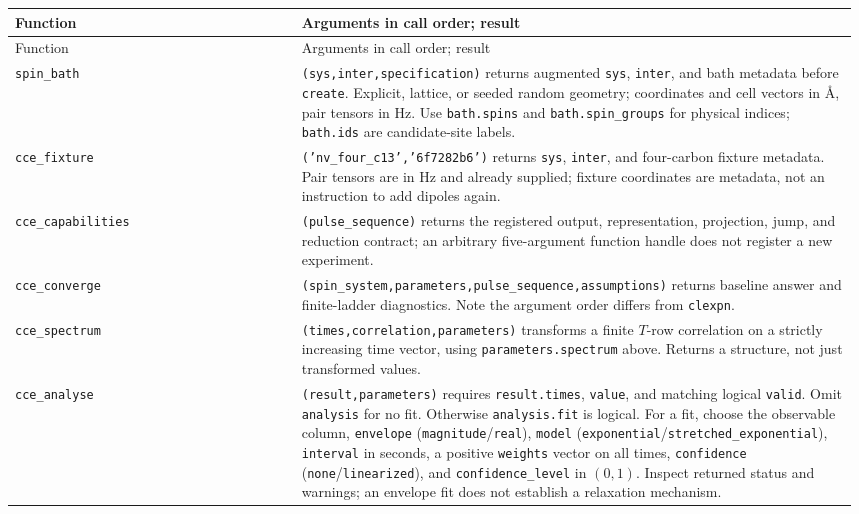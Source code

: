 \documentclass[11pt,a4paper]{article}
\newcommand{\code}[1]{\texttt{#1}}
\begin{document}
\begingroup\small
\begin{longtable}{@{}>{\raggedright\arraybackslash}p{0.335\linewidth}@{\hspace{0.025\linewidth}}>{\raggedright\arraybackslash}p{0.64\linewidth}@{}}
\toprule
Function & Arguments in call order; result\\
\midrule\endfirsthead
\toprule
Function & Arguments in call order; result\\
\midrule\endhead
\midrule\endfoot
\bottomrule\endlastfoot
\code{spin\_bath} & \code{(sys,inter,specification)} returns augmented \code{sys}, \code{inter}, and bath metadata before \code{create}. Explicit, lattice, or seeded random geometry; coordinates and cell vectors in \AA{}, pair tensors in Hz. Use \code{bath.spins} and \code{bath.spin\_groups} for physical indices; \code{bath.ids} are candidate-site labels.\\
\code{cce\_fixture} & \code{('nv\_four\_c13','6f7282b6')} returns \code{sys}, \code{inter}, and four-carbon fixture metadata. Pair tensors are in Hz and already supplied; fixture coordinates are metadata, not an instruction to add dipoles again.\\
\code{cce\_capabilities} & \code{(pulse\_sequence)} returns the registered output, representation, projection, jump, and reduction contract; an arbitrary five-argument function handle does not register a new experiment.\\
\code{cce\_converge} & \code{(spin\_system,parameters,pulse\_sequence,assumptions)} returns baseline answer and finite-ladder diagnostics. Note the argument order differs from \code{clexpn}.\\
\code{cce\_spectrum} & \code{(times,correlation,parameters)} transforms a finite $T$-row correlation on a strictly increasing time vector, using \code{parameters.spectrum} above. Returns a structure, not just transformed values.\\
\code{cce\_analyse} & \code{(result,parameters)} requires \code{result.times}, \code{value}, and matching logical \code{valid}. Omit \code{analysis} for no fit. Otherwise \code{analysis.fit} is logical. For a fit, choose the observable column, \code{envelope} (\code{magnitude}/\code{real}), \code{model} (\code{exponential}/\code{stretched\_exponential}), \code{interval} in seconds, a positive \code{weights} vector on all times, \code{confidence} (\code{none}/\code{linearized}), and \code{confidence\_level} in $(0,1)$. Inspect returned status and warnings; an envelope fit does not establish a relaxation mechanism.\\
\end{longtable}
\endgroup
\end{document}

